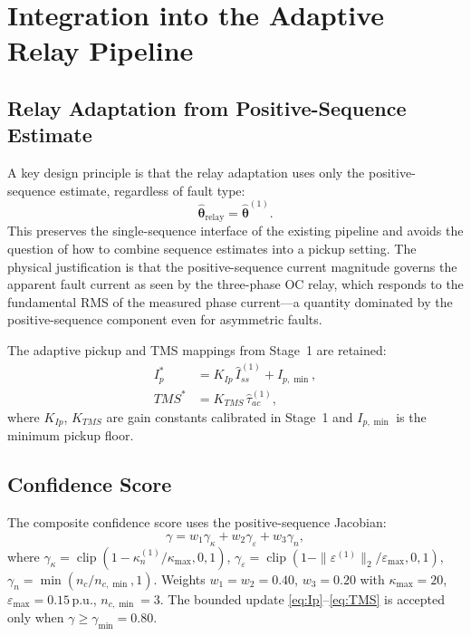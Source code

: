 \documentclass[10pt,journal,twoside]{IEEEtran}
\newcommand{\pu}{\,\text{p.u.}}
\begin{document}
\section{Integration into the Adaptive Relay Pipeline}
\label{sec:pipeline}

\subsection{Relay Adaptation from Positive-Sequence Estimate}
\label{sec:pipeline:adaptation}

A key design principle is that the relay adaptation uses only the
positive-sequence estimate, regardless of fault type:
\begin{equation}
\hat{\bm{\theta}}_{\mathrm{relay}} = \hat{\bm{\theta}}^{(1)}.
\label{eq:relay_theta}
\end{equation}
This preserves the single-sequence interface of the existing pipeline
and avoids the question of how to combine sequence estimates into a
pickup setting.  The physical justification is that the positive-sequence
current magnitude governs the apparent fault current as seen by the
three-phase OC relay, which responds to the fundamental RMS of the measured
phase current---a quantity dominated by the positive-sequence component
even for asymmetric faults.

The adaptive pickup and TMS mappings from Stage~1 are retained:
\begin{align}
I_p^* &= K_{Ip}\,\hat{I}_{ss}^{(1)} + I_{p,\min},
          \label{eq:Ip}\\
TMS^* &= K_{TMS}\,\hat{\tau}_{ac}^{(1)},
          \label{eq:TMS}
\end{align}
where $K_{Ip}$, $K_{TMS}$ are gain constants calibrated in Stage~1
\cite{Eluvathingal2025_TR01} and $I_{p,\min}$ is the minimum pickup floor.

\subsection{Confidence Score}
\label{sec:pipeline:confidence}

The composite confidence score uses the positive-sequence Jacobian:
\begin{equation}
\gamma = w_1\gamma_{\kappa} + w_2\gamma_{\varepsilon} + w_3\gamma_n,
\label{eq:gamma}
\end{equation}
where
$\gamma_{\kappa} = \operatorname{clip}(1 - \kappa_n^{(1)}/\kappa_{\max}, 0, 1)$,
$\gamma_{\varepsilon} = \operatorname{clip}(1 - \|{\varepsilon}^{(1)}\|_2/\varepsilon_{\max}, 0, 1)$,
$\gamma_n = \min(n_c/n_{c,\min}, 1)$.
Weights $w_1 = w_2 = 0.40$, $w_3 = 0.20$ with
$\kappa_{\max} = 20$, $\varepsilon_{\max} = 0.15\pu$, $n_{c,\min} = 3$.
The bounded update \eqref{eq:Ip}--\eqref{eq:TMS} is accepted only when
$\gamma \geq \gamma_{\min} = 0.80$.
\end{document}
